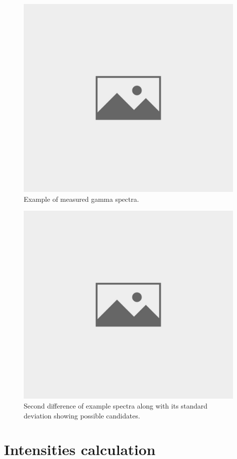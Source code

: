 \begin{figure}[H]
 \centering
 \includegraphics[scale=0.105, angle = 0]{./pictures/NoPicture.jpg}
 \caption{Example of measured gamma spectra.}
 \label{Example}
 
\end{figure}

\begin{figure}[H]
 \centering
 \includegraphics[scale=0.105, angle = 0]{./pictures/NoPicture.jpg}
 \caption{Second difference of example spectra along with its standard deviation showing possible candidates.}
 \label{secondDerivative}
 
\end{figure}

\section{Intensities calculation}
